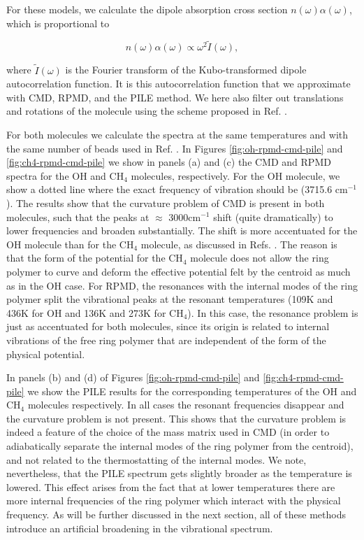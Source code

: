 \documentclass[aps,prb,superscriptaddress,amsmath,amssymb,showpacs,twocolumn]{revtex4}
\begin{document}
For these models, we calculate the dipole absorption cross section $n(\omega)\alpha(\omega)$, which is proportional to 

\begin{equation}
n(\omega)\alpha(\omega) \propto \omega^2  \tilde{I}(\omega),
\end{equation}

\noindent where $\tilde{I}(\omega)$ is the Fourier transform of the Kubo-transformed dipole autocorrelation function.
It is this autocorrelation function that we approximate with CMD, RPMD, and the PILE method. We here also filter out
translations and rotations of the molecule using the scheme proposed in Ref. \cite{witt+09jcp}.


For  both molecules we calculate the spectra at the same temperatures and with the same number of beads used in Ref. \cite{witt+09jcp}.  
In Figures \ref{fig:oh-rpmd-cmd-pile} and \ref{fig:ch4-rpmd-cmd-pile} we show 
in panels (a) and (c) the CMD and RPMD 
spectra for the OH and CH$_4$ molecules, respectively.
For the OH molecule, we show a dotted line where the
exact frequency of vibration should be (3715.6 cm$^{-1}$). 
The results show that the curvature problem of CMD is
present in both molecules,
such that the peaks at $\approx$ 3000cm$^{-1}$ shift (quite dramatically)
to lower frequencies and broaden substantially.
The shift is more accentuated for the OH molecule than for the
CH$_4$ molecule, as discussed in Refs. \cite{witt+09jcp, ivanov+10jpc}.
The reason is that the form of the potential for the CH$_4$ molecule
does not allow the ring polymer to curve and deform the effective
potential felt by the centroid as much as in the OH case.
For RPMD, the resonances with the internal modes of the ring polymer
split the vibrational peaks at the resonant temperatures (109K and 436K for
OH and 136K and 273K for CH$_4$). In this case, the resonance
problem is just as accentuated for both molecules, since its origin is 
related to internal vibrations of the free ring polymer that are 
independent of the form of the physical potential. 


In panels (b) and (d) of Figures  \ref{fig:oh-rpmd-cmd-pile} and \ref{fig:ch4-rpmd-cmd-pile} we show the PILE results for the corresponding temperatures of the OH and CH$_4$ molecules
respectively. In all cases the resonant frequencies disappear and the curvature problem is not present. 
This shows that the curvature problem is indeed a feature of the choice
of the mass matrix used in CMD (in order to adiabatically separate the 
internal modes of the ring polymer from the centroid), 
and not related to the thermostatting of the internal modes.
We note, nevertheless, that the PILE
spectrum gets slightly broader as the temperature is lowered. 
This effect arises from the fact that at lower
temperatures there are more internal frequencies of the
 ring polymer which interact with the physical frequency.
 As will be further discussed in the next section, all
 of these methods introduce an artificial broadening in the vibrational spectrum.
\end{document}
